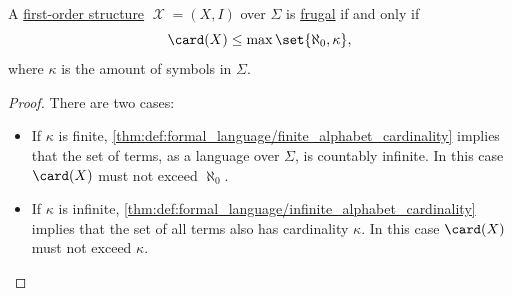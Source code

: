 \begin{proposition}\label{thm:fol_frugality_characterization}
  A \hyperref[def:fol_structure]{first-order structure} \( \mscrX = (X, I) \) over \( \Sigma \) is \hyperref[def:fol_frugal_structure]{frugal} if and only if
  \begin{equation*}
    \card(X) \leq \max\set{ \aleph_0, \kappa },
  \end{equation*}
  where \( \kappa \) is the amount of symbols in \( \Sigma \).
\end{proposition}
\begin{proof}
  There are two cases:
  \begin{itemize}
    \item If \( \kappa \) is finite, \cref{thm:def:formal_language/finite_alphabet_cardinality} implies that the set of terms, as a language over \( \Sigma \), is countably infinite. In this case \( \card(X) \) must not exceed \( \aleph_0 \).

    \item If \( \kappa \) is infinite, \cref{thm:def:formal_language/infinite_alphabet_cardinality} implies that the set of all terms also has cardinality \( \kappa \). In this case \( \card(X) \) must not exceed \( \kappa \).
  \end{itemize}
\end{proof}

